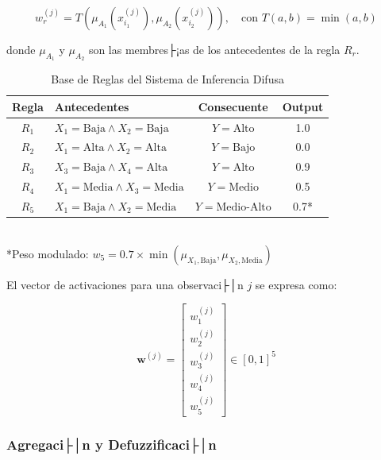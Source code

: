 \begin{equation}
w_r^{(j)} = T\left(\mu_{A_1}(x_{i_1}^{(j)}), \mu_{A_2}(x_{i_2}^{(j)})\right), \quad \text{con } T(a, b) = \min(a, b)
\label{eq:tnorm_godel}
\end{equation}

donde \(\mu_{A_1}\) y \(\mu_{A_2}\) son las membres├¡as de los antecedentes de la regla \(R_r\).

\begin{table}[H]
\centering
\caption{Base de Reglas del Sistema de Inferencia Difusa}
\label{tab:reglas_difusas}
\small
\begin{tabular}{@{}clcc@{}}
\toprule
\textbf{Regla} & \textbf{Antecedentes} & \textbf{Consecuente} & \textbf{Output} \\
\midrule
\(R_1\) & \(X_1=\text{Baja} \land X_2=\text{Baja}\)   & \(Y=\text{Alto}\)       & 1.0 \\
\(R_2\) & \(X_1=\text{Alta} \land X_2=\text{Alta}\)   & \(Y=\text{Bajo}\)       & 0.0 \\
\(R_3\) & \(X_3=\text{Baja} \land X_4=\text{Alta}\)   & \(Y=\text{Alto}\)       & 0.9 \\
\(R_4\) & \(X_1=\text{Media} \land X_3=\text{Media}\) & \(Y=\text{Medio}\)      & 0.5 \\
\(R_5\) & \(X_1=\text{Baja} \land X_2=\text{Media}\)  & \(Y=\text{Medio-Alto}\) & 0.7* \\
\bottomrule
\end{tabular}
\\[5pt]
\footnotesize{*Peso modulado: \(w_5 = 0.7 \times \min(\mu_{X_1,\text{Baja}}, \mu_{X_2,\text{Media}})\)}
\end{table}

El vector de activaciones para una observaci├│n \(j\) se expresa como:

\begin{equation}
\mathbf{w}^{(j)} = \begin{bmatrix}
w_1^{(j)} \\
w_2^{(j)} \\
w_3^{(j)} \\
w_4^{(j)} \\
w_5^{(j)}
\end{bmatrix} \in [0,1]^5
\label{eq:vector_activaciones}
\end{equation}

\subsubsection{Agregaci├│n y Defuzzificaci├│n}
\label{subsubsec:agregacion_defuzz}

